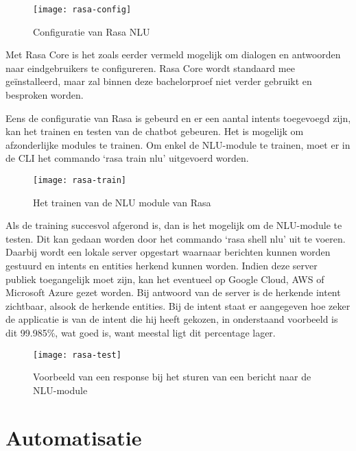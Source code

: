 \begin{figure}[H]
    \label{fig:rasa-config}
    \centering
    \texttt{[image: rasa-config]}
    \caption{Configuratie van Rasa NLU}
\end{figure}

Met Rasa Core is het zoals eerder vermeld mogelijk om dialogen en antwoorden naar eindgebruikers te configureren. Rasa Core wordt standaard mee geïnstalleerd, maar zal binnen deze bachelorproef niet verder gebruikt en besproken worden.

Eens de configuratie van Rasa is gebeurd en er een aantal intents toegevoegd zijn, kan het trainen en testen van de chatbot gebeuren. Het is mogelijk om afzonderlijke modules te trainen. Om enkel de NLU-module te trainen, moet er in de CLI het commando ‘rasa train nlu’ uitgevoerd worden.

\begin{figure}[H]
    \label{fig:rasa-train}
    \centering
    \texttt{[image: rasa-train]}
    \caption{Het trainen van de NLU module van Rasa}
\end{figure}

Als de training succesvol afgerond is, dan is het mogelijk om de NLU-module te testen. Dit kan gedaan worden door het commando ‘rasa shell nlu’ uit te voeren. Daarbij wordt een lokale server opgestart waarnaar berichten kunnen worden gestuurd en intents en entities herkend kunnen worden. Indien deze server publiek toegangelijk moet zijn, kan het eventueel op Google Cloud, AWS of Microsoft Azure gezet worden. Bij antwoord van de server is de herkende intent zichtbaar, alsook de herkende entities. Bij de intent staat er aangegeven hoe zeker de applicatie is van de intent die hij heeft gekozen, in onderstaand voorbeeld is dit 99.985\%, wat goed is, want meestal ligt dit percentage lager.

\begin{figure}[H]
    \label{fig:rasa-test}
    \centering
    \texttt{[image: rasa-test]}
    \caption{Voorbeeld van een response bij het sturen van een bericht naar de NLU-module}
\end{figure}

\section{Automatisatie}
\label{sec:automatisatie}

